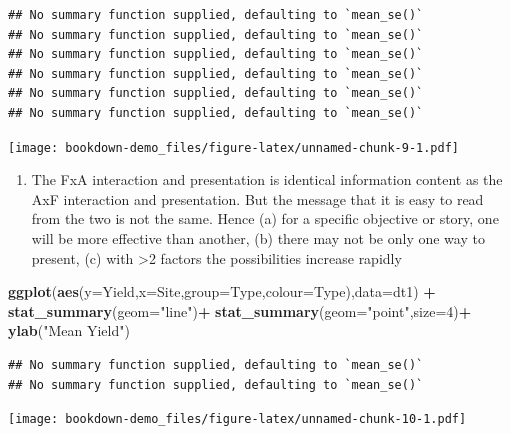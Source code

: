 \documentclass[
]{book}
\newenvironment{Shaded}{\begin{snugshade}}{\end{snugshade}}
\newcommand{\DataTypeTok}[1]{\textcolor[rgb]{0.13,0.29,0.53}{#1}}
\newcommand{\DecValTok}[1]{\textcolor[rgb]{0.00,0.00,0.81}{#1}}
\newcommand{\KeywordTok}[1]{\textcolor[rgb]{0.13,0.29,0.53}{\textbf{#1}}}
\newcommand{\NormalTok}[1]{#1}
\newcommand{\OperatorTok}[1]{\textcolor[rgb]{0.81,0.36,0.00}{\textbf{#1}}}
\newcommand{\StringTok}[1]{\textcolor[rgb]{0.31,0.60,0.02}{#1}}
\providecommand{\tightlist}{%
  \setlength{\itemsep}{0pt}\setlength{\parskip}{0pt}}
\begin{document}
\begin{verbatim}
## No summary function supplied, defaulting to `mean_se()`
## No summary function supplied, defaulting to `mean_se()`
## No summary function supplied, defaulting to `mean_se()`
## No summary function supplied, defaulting to `mean_se()`
## No summary function supplied, defaulting to `mean_se()`
## No summary function supplied, defaulting to `mean_se()`
\end{verbatim}

\texttt{[image: bookdown-demo\_files/figure-latex/unnamed-chunk-9-1.pdf]}

\begin{enumerate}
\def\labelenumi{\arabic{enumi}.}
\setcounter{enumi}{6}
\tightlist
\item
  The FxA interaction and presentation is identical information content as the AxF interaction and presentation. But the message that it is easy to read from the two is not the same. Hence (a) for a specific objective or story, one will be more effective than another, (b) there may not be only one way to present, (c) with \textgreater2 factors the possibilities increase rapidly
\end{enumerate}

\begin{Shaded}
\begin{Highlighting}[]
\KeywordTok{ggplot}\NormalTok{(}\KeywordTok{aes}\NormalTok{(}\DataTypeTok{y=}\NormalTok{Yield,}\DataTypeTok{x=}\NormalTok{Site,}\DataTypeTok{group=}\NormalTok{Type,}\DataTypeTok{colour=}\NormalTok{Type),}\DataTypeTok{data=}\NormalTok{dt1) }\OperatorTok{+}
\StringTok{  }\KeywordTok{stat_summary}\NormalTok{(}\DataTypeTok{geom=}\StringTok{"line"}\NormalTok{)}\OperatorTok{+}
\StringTok{    }\KeywordTok{stat_summary}\NormalTok{(}\DataTypeTok{geom=}\StringTok{"point"}\NormalTok{,}\DataTypeTok{size=}\DecValTok{4}\NormalTok{)}\OperatorTok{+}
\StringTok{      }\KeywordTok{ylab}\NormalTok{(}\StringTok{"Mean Yield"}\NormalTok{)}
\end{Highlighting}
\end{Shaded}

\begin{verbatim}
## No summary function supplied, defaulting to `mean_se()`
## No summary function supplied, defaulting to `mean_se()`
\end{verbatim}

\texttt{[image: bookdown-demo\_files/figure-latex/unnamed-chunk-10-1.pdf]}
\end{document}
